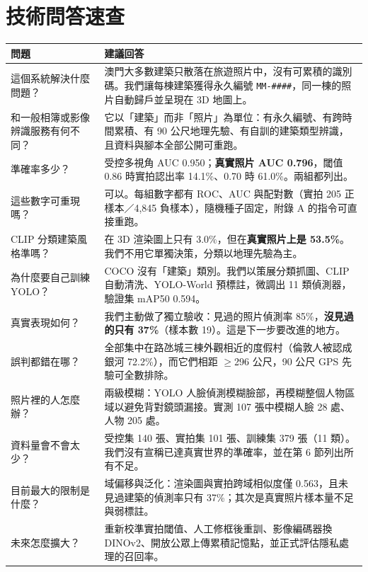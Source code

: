 \documentclass[11pt,a4paper,fontset=windows]{ctexart}
\begin{document}
\section{技術問答速查}
\begin{longtable}{@{}p{4.2cm}p{11.4cm}@{}}
\toprule
\textbf{問題} & \textbf{建議回答} \\
\midrule
\endhead
這個系統解決什麼問題？ & 澳門大多數建築只散落在旅遊照片中，沒有可累積的識別碼。我們讓每棟建築獲得永久編號 \texttt{MM-\#\#\#\#}，同一棟的照片自動歸戶並呈現在 3D 地圖上。 \\
和一般相簿或影像辨識服務有何不同？ & 它以「建築」而非「照片」為單位：有永久編號、有跨時間累積、有 90 公尺地理先驗、有自訓的建築類型辨識，且資料與腳本全部公開可重跑。 \\
準確率多少？ & 受控多視角 AUC 0.950；\textbf{真實照片 AUC 0.796}，閾值 0.86 時實拍認出率 14.1\%、0.70 時 61.0\%。兩組都列出。 \\
這些數字可重現嗎？ & 可以。每組數字都有 ROC、AUC 與配對數（實拍 205 正樣本／4,845 負樣本），隨機種子固定，附錄 A 的指令可直接重跑。 \\
CLIP 分類建築風格準嗎？ & 在 3D 渲染圖上只有 3.0\%，但在\textbf{真實照片上是 53.5\%}。我們不用它單獨決策，分類以地理先驗為主。 \\
為什麼要自己訓練 YOLO？ & COCO 沒有「建築」類別。我們以策展分類抓圖、CLIP 自動清洗、YOLO-World 預標註，微調出 11 類偵測器，驗證集 mAP50 0.594。 \\
真實表現如何？ & 我們主動做了獨立驗收：見過的照片偵測率 85\%，\textbf{沒見過的只有 37\%}（樣本數 19）。這是下一步要改進的地方。 \\
誤判都錯在哪？ & 全部集中在路氹城三棟外觀相近的度假村（倫敦人被認成銀河 72.2\%），而它們相距 $\ge$296 公尺，90 公尺 GPS 先驗可全數排除。 \\
照片裡的人怎麼辦？ & 兩級模糊：YOLO 人臉偵測模糊臉部，再模糊整個人物區域以避免背對鏡頭漏接。實測 107 張中模糊人臉 28 處、人物 205 處。 \\
資料量會不會太少？ & 受控集 140 張、實拍集 101 張、訓練集 379 張（11 類）。我們沒有宣稱已達真實世界的準確率，並在第 6 節列出所有不足。 \\
目前最大的限制是什麼？ & 域偏移與泛化：渲染圖與實拍跨域相似度僅 0.563，且未見過建築的偵測率只有 37\%；其次是真實照片樣本量不足與弱標註。 \\
未來怎麼擴大？ & 重新校準實拍閾值、人工修框後重訓、影像編碼器換 DINOv2、開放公眾上傳累積記憶點，並正式評估隱私處理的召回率。 \\
\bottomrule
\end{longtable}
\end{document}
